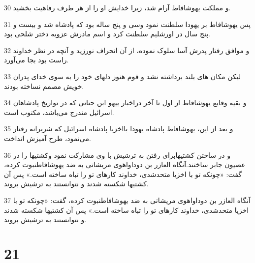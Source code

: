\par 30 و مملکت یهوشافاط آرام شد، زیرا خدایش او را از هر طرف رفاهیت بخشید.
\par 31 پس یهوشافاط بر یهودا سلطنت نمود وسی و پنج ساله بود که پادشاه شد و بیست و پنج سال در اورشلیم سلطنت کرد و اسم مادرش عزوبه دختر شلحی بود.
\par 32 و موافق رفتار پدرش آسا سلوک نموده، از آن انحراف نورزید و آنچه در نظر خداوند راست بود بجا می‌آورد.
\par 33 لیکن مکان های بلند برداشته نشد و قوم هنوز دلهای خود را به سوی خدای پدران خویش مصمم نساخته بودند.
\par 34 و بقیه وقایع یهوشافاط از اول تا آخر دراخبار ییهو ابن حنانی که در تواریخ پادشاهان اسرائیل مندرج می‌باشد، مکتوب است.
\par 35 و بعد از این، یهوشافاط پادشاه یهودا بااخزیا پادشاه اسرائیل که شریرانه رفتار می‌نمود، طرح آمیزش انداخت.
\par 36 و در ساختن کشتیهابرای رفتن به ترشیش با وی مشارکت نمود وکشتیها را در عصیون جابر ساختند.آنگاه العازر بن دوداواهوی مریشاتی به ضد یهوشافاطنبوت کرده، گفت: «چونکه تو با اخزیا متحدشدی، خداوند کارهای تو را تباه ساخته است.» پس آن کشتیها شکسته شدند و نتوانستند به ترشیش بروند.
\par 37 آنگاه العازر بن دوداواهوی مریشاتی به ضد یهوشافاطنبوت کرده، گفت: «چونکه تو با اخزیا متحدشدی، خداوند کارهای تو را تباه ساخته است.» پس آن کشتیها شکسته شدند و نتوانستند به ترشیش بروند.
 
\chapter{21}

